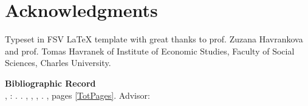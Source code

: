 \section*{Acknowledgments}

\vfill

\noindent Typeset in FSV \LaTeX \hspace{0cm} template with great thanks to prof. Zuzana Havrankova and prof. Tomas Havranek of Institute of Economic Studies, Faculty of Social Sciences, Charles University. 

\bigskip

\noindent \textbf{Bibliographic Record} \\
\LastNameDP, \FirstNameDP: \emph{\Bookname}. \BookName. \CUNI, \FSS, \IES, \Place. \Year, pages \ref*{TotPages}. Advisor: \Supervisor


